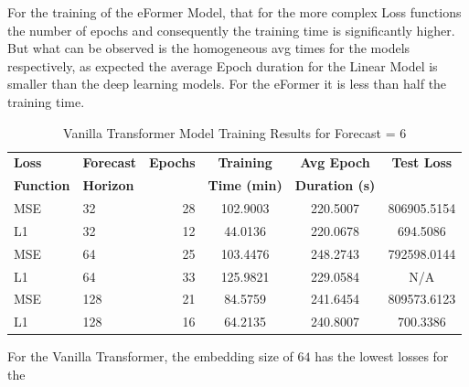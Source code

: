 \documentclass{article}
\begin{document}
For the training of the eFormer Model, that for the more complex Loss functions the number of epochs and consequently the training time is significantly higher. But what can be observed is the homogeneous avg times for the models respectively, as expected the average Epoch duration for the Linear Model is smaller than the deep learning models. For the eFormer it is less than half the training time. 

\begin{table}
    \centering
    \footnotesize
    \caption{Vanilla Transformer Model Training Results for Forecast = 6}
    \begin{tabular}{l|l|r|S|S|S}
        \toprule
        \textbf{Loss} & \textbf{Forecast} & \textbf{Epochs} & \textbf{Training} & \textbf{Avg Epoch} & \textbf{Test Loss} \\
        \textbf{Function} & \textbf{Horizon} & & \textbf{Time (min)} & \textbf{Duration (s)} & \\
        \midrule
        MSE & 32 & 28 & 102.9003 & 220.5007 & 806905.5154 \\
        L1 & 32 & 12 & 44.0136 & 220.0678 & 694.5086 \\
        \midrule
        MSE & 64 & 25 & 103.4476 & 248.2743 & 792598.0144 \\
        L1 & 64 & 33 & 125.9821 & 229.0584 & N/A \\
        \midrule
        MSE & 128 & 21 & 84.5759 & 241.6454 & 809573.6123 \\
        L1 & 128 & 16 & 64.2135 & 240.8007 & 700.3386 \\
      \bottomrule
    \end{tabular}
    \label{tab:vanillatransformer_training_f6}
    \end{table}

For the Vanilla Transformer, the embedding size of $64$ has the lowest losses for the 
\end{document}

